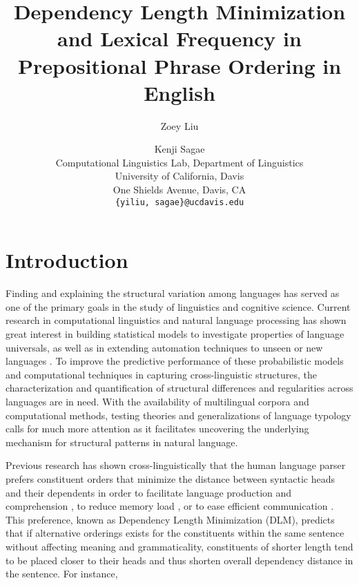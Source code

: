 \documentclass[11pt,letterpaper]{article}
\title{Dependency Length Minimization and Lexical Frequency in Prepositional Phrase Ordering in English}
\author{Zoey Liu \and Kenji Sagae \\
         Computational Linguistics Lab, Department of Linguistics \\ University of California, Davis \\ One Shields Avenue, Davis, CA \\ {\tt \{yiliu, sagae\}@ucdavis.edu}}
\date{}
\begin{document}
\maketitle


\section{Introduction}
Finding and explaining the structural variation among languages has served as one of the primary goals in the study of linguistics and cognitive science. Current research in computational linguistics and natural language processing has shown great interest in building statistical models to investigate properties of language universals, as well as in extending automation techniques to unseen or new languages \cite{merlo2015predicting}. To improve the predictive performance of these probabilistic models and computational techniques in capturing cross-linguistic structures, the characterization and quantification of structural differences and regularities across languages are in need. With the availability of multilingual corpora and computational methods, testing theories and generalizations of language typology calls for much more attention as it facilitates uncovering the underlying mechanism for structural patterns in natural language.

Previous research has shown cross-linguistically that the human language parser prefers constituent orders that minimize the distance between syntactic heads and their dependents \cite{futrell2015large} in order to facilitate language production and comprehension \cite{levy2013syntactic}, to reduce memory load \cite{gibson1998linguistic}, or to ease efficient communication \cite{hawkins2014cross}. This preference, known as Dependency Length Minimization (DLM), predicts that if alternative orderings exists for the constituents within the same sentence without affecting meaning and grammaticality, constituents of shorter length tend to be placed closer to their heads and thus shorten overall dependency distance in the sentence. For instance, 
\end{document}
